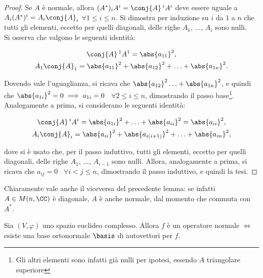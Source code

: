 \documentclass[11pt]{article}
\begin{document}
	\begin{proof}
		Se $A$ è normale, allora $(A^*)_i A^i = \conj{A}\,^i A^i$ deve essere uguale a
		$A_i (A^*)^i = A_i \conj{A}_i$ $\forall 1 \leq i \leq n$. Si dimostra per induzione
		su $i$ da $1$ a $n$ che tutti gli elementi, eccetto per quelli diagonali, delle
		righe $A_1$, ..., $A_i$ sono nulli. \\
		
		\basestep Si osserva che valgono le seguenti identità:
		
		\begin{gather*}
			\conj{A}\,^1 A^1 = \abs{a_{11}}^2, \\
			A_1 \conj{A}_1 = \abs{a_{11}}^2 + \abs{a_{12}}^2 + \ldots + \abs{a_{1n}}^2.
		\end{gather*}
		
		Dovendo vale l'uguaglianza, si ricava che $\abs{a_{12}}^2 \ldots + \abs{a_{1n}}^2$,
		e quindi che $\abs{a_{1i}}^2 = 0 \implies a_{1i} = 0$ \, $\forall 2 \leq i \leq n$,
		dimostrando il passo base\footnote{Gli altri elementi sono infatti già nulli per ipotesi, essendo
		$A$ triangolare superiore}. \\
		
		\inductivestep Analogamente a prima, si considerano le seguenti identità:
		
		\begin{gather*}
			\conj{A}\,^i A^i = \abs{a_{1i}}^2 + \ldots +  \abs{a_{ii}}^2 = \abs{a_{ii}}^2, \\
			A_i \conj{A}_i = \abs{a_{ii}}^2 + \abs{a_{i(i+1)}}^2 + \ldots + \abs{a_{in}}^2,
		\end{gather*}
		
		dove si è usato che, per il passo induttivo, tutti gli elementi, eccetto per quelli diagonali, delle
		righe $A_1$, ..., $A_{i-1}$ sono nulli. Allora, analogamente a prima, si ricava che
		$a_{ij} = 0$ \, $\forall i < j \leq n$, dimostrando il passo induttivo, e quindi la tesi.
	\end{proof}
	
	\begin{remark}
		Chiaramente vale anche il viceversa del precedente lemma: se infatti $A \in M(n, \CC)$ è diagonale,
		$A$ è anche normale, dal momento che commuta con $A^*$.
	\end{remark}
	
	\begin{theorem}
		Sia $(V, \varphi)$ uno spazio euclideo complesso. Allora $f$ è un operatore normale $\iff$ esiste
		una base ortonormale $\basis$ di autovettori per $f$.
	\end{theorem}
	
\end{document}
